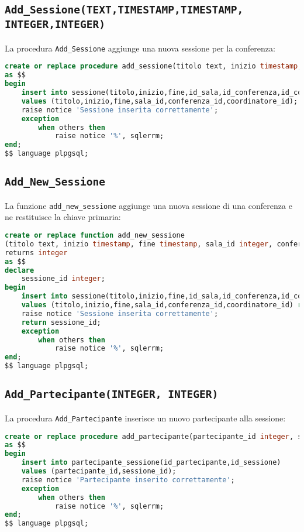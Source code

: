\subsection{\texttt{Add\_Sessione(TEXT,TIMESTAMP,TIMESTAMP, INTEGER,INTEGER)}}
La procedura \texttt{Add\_Sessione} aggiunge una nuova sessione per la conferenza:
\begin{lstlisting}[language=SQL, style=mystyle]
create or replace procedure add_sessione(titolo text, inizio timestamp, fine timestamp, sala_id integer, conferenza_id integer,coordinatore_id integer)
as $$
begin
    insert into sessione(titolo,inizio,fine,id_sala,id_conferenza,id_coordinatore)
    values (titolo,inizio,fine,sala_id,conferenza_id,coordinatore_id);
    raise notice 'Sessione inserita correttamente';
    exception
        when others then
            raise notice '%', sqlerrm;
end;
$$ language plpgsql;
\end{lstlisting}
\subsection{\texttt{Add\_New\_Sessione}}
La funzione \texttt{add\_new\_sessione} aggiunge una nuova sessione di una conferenza e ne restituisce la chiave primaria:
\begin{lstlisting}[language=SQL,style=mystyle]
create or replace function add_new_sessione
(titolo text, inizio timestamp, fine timestamp, sala_id integer, conferenza_id integer,coordinatore_id integer) 
returns integer
as $$
declare
    sessione_id integer;
begin
    insert into sessione(titolo,inizio,fine,id_sala,id_conferenza,id_coordinatore)
    values (titolo,inizio,fine,sala_id,conferenza_id,coordinatore_id) returning id_sessione into sessione_id;
    raise notice 'Sessione inserita correttamente';
    return sessione_id;
    exception
        when others then
            raise notice '%', sqlerrm;
end;
$$ language plpgsql;
\end{lstlisting}
\subsection{\texttt{Add\_Partecipante(INTEGER, INTEGER)}}
La procedura \texttt{Add\_Partecipante} inserisce un nuovo partecipante alla sessione:
\begin{lstlisting}[language=SQL, style=mystyle]
create or replace procedure add_partecipante(partecipante_id integer, sessione_id integer)
as $$
begin
    insert into partecipante_sessione(id_partecipante,id_sessione)
    values (partecipante_id,sessione_id);
    raise notice 'Partecipante inserito correttamente';
    exception
        when others then
            raise notice '%', sqlerrm;
end;
$$ language plpgsql;
\end{lstlisting}
